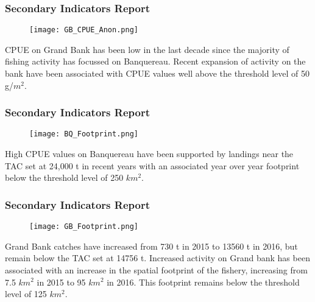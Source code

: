 \documentclass{beamer}
\begin{document}
\begin{frame}
\frametitle{Secondary Indicators Report}
\begin{figure}
        \begin{center}
            \texttt{[image: GB\_CPUE\_Anon.png]}
        \end{center}
    \end{figure}

CPUE on Grand Bank has been low in the last decade since the majority of fishing activity has focussed on Banquereau. Recent expansion of activity on the bank have been associated with CPUE values well above the threshold level of 50 g/\(m^2\).
\end{frame}


\begin{frame}
\frametitle{Secondary Indicators Report}
\begin{figure}
        \begin{center}
            \texttt{[image: BQ\_Footprint.png]}
        \end{center}
    \end{figure}

High CPUE values on Banquereau have been supported by landings near the TAC set at 24,000 t in recent years with an associated year over year footprint below the threshold level of 250 \(km^2\).
\end{frame}


\begin{frame}
\frametitle{Secondary Indicators Report}
\begin{figure}
        \begin{center}
            \texttt{[image: GB\_Footprint.png]}
        \end{center}
    \end{figure}

Grand Bank catches have increased from 730 t in 2015 to 13560 t in 2016, but remain below the TAC set at 14756 t. Increased activity on Grand bank has been associated with an increase in the spatial footprint of the fishery, increasing from 7.5 \(km^2\) in 2015 to  95 \(km^2\) in 2016. This footprint remains below the threshold level of 125 \(km^2\).
\end{frame}
\end{document}
